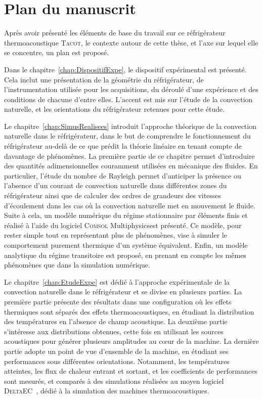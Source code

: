 \section{Plan du manuscrit}
Après avoir présenté les éléments de base du travail sur ce réfrigérateur thermoacoustique \textsc{Tacot}, le contexte autour de cette thèse, et l'axe sur lequel elle se concentre, un plan est proposé.\medskip


Dans le chapitre~\ref{chap:DispositifExpe}, le dispositif expérimental est présenté. Cela inclut une présentation de la géométrie du réfrigérateur, de l’instrumentation utilisée pour les acquisitions, du déroulé d’une expérience et des conditions de chacune d’entre elles. L’accent est mis sur l’étude de la convection naturelle, et les orientations du réfrigérateur retenues pour cette étude.\smallskip

Le chapitre~\ref{chap:SimusRealisees} introduit l'approche théorique de la convection naturelle dans le réfrigérateur, dans le but de comprendre le fonctionnement du réfrigérateur au-delà de ce que prédit la théorie linéaire en tenant compte de davantage de phénomènes. La première partie de ce chapitre permet d'introduire des quantités adimensionnelles couramment utilisées en mécanique des fluides. En particulier, l'étude du nombre de Rayleigh permet d'anticiper la présence ou l'absence d'un courant de convection naturelle dans différentes zones du réfrigérateur ainsi que de calculer des ordres de grandeurs des vitesses d'écoulement dans les cas où la convection naturelle met en mouvement le fluide. Suite à cela, un modèle numérique du régime stationnaire par éléments finis et réalisé à l'aide du logiciel \textsc{Comsol} Multiphysics\textss\textregistered est présenté. Ce modèle, pour rester simple tout en représentant plus de phénomènes, vise à simuler le comportement purement thermique d'un système équivalent. Enfin, un modèle analytique du régime transitoire est proposé, en prenant en compte les mêmes phénomènes que dans la simulation numérique.\smallskip

Le chapitre~\ref{chap:EtudeExpe} est dédié à l'approche expérimentale de la convection naturelle dans le réfrigérateur et se divise en plusieurs parties. La première partie présente des résultats dans une configuration où les effets thermiques sont séparés des effets thermoacoustiques, en étudiant la distribution des températures en l'absence de champ acoustique. La deuxième partie s'intéresse aux distributions obtenues, cette fois en utilisant les sources acoustiques pour générer plusieurs amplitudes au c\oe{}ur de la machine. La dernière partie adopte un point de vue d'ensemble de la machine, en étudiant ses performances sous différentes orientations. Notamment, les températures atteintes, les flux de chaleur entrant et sortant, et les coefficients de performances sont mesurés, et comparés à des simulations réalisées au moyen logiciel \textsc{DeltaEC}~\cite{DeltaEC}, dédié à la simulation des machines thermoacoustiques.\smallskip

